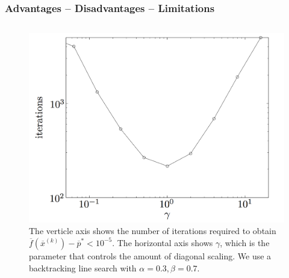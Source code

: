 \begin{frame}
  \frametitle{Advantages -- Disadvantages -- Limitations}



\begin{columns}
  \begin{column}{0.5\textwidth}
    \begin{figure}[ht!]
      \centering
\includegraphics[scale=0.15]{pics/ga1.png}
\caption{\tiny The
  verticle axis shows the number of iterations required to obtain
  $\overline{f}(\overline{x}^{(k)}) - \overline{p}^* < 10^{-5}$. The
  horizontal axis shows $\gamma$, which is the  parameter that controls the amount of diagonal scaling. We use a
backtracking line search with $\alpha = 0.3, \beta = 0.7$.}
    \end{figure}
  \end{column}


\end{columns}
\end{frame}
